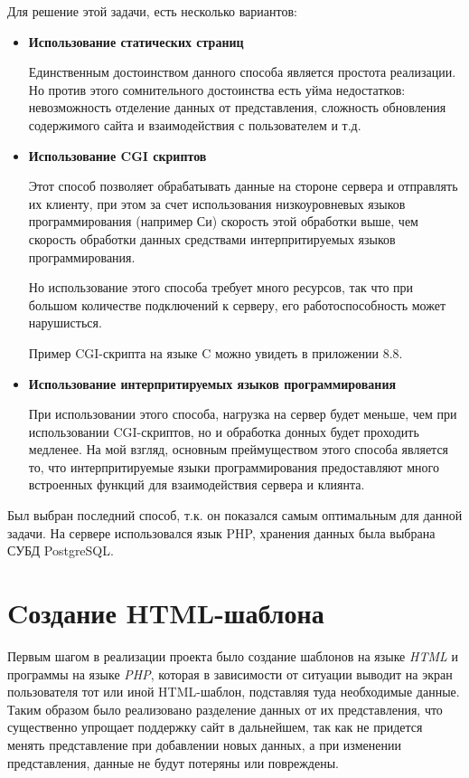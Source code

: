 \documentclass[a4paper]{article}
\begin{document}
Для решение этой задачи, есть несколько вариантов:
\begin{itemize}
\item \textbf{Использование статических страниц}

Единственным достоинством данного способа является простота реализации. Но против этого сомнительного достоинства есть уйма недостатков: невозможность отделение данных от представления, сложность обновления содержимого сайта и взаимодействия с пользователем и т.д.
\item \textbf{Использование CGI скриптов}

Этот способ позволяет обрабатывать данные на стороне сервера и отправлять их клиенту, при этом за счет использования низкоуровневых языков программирования (например Си) скорость этой обработки выше, чем скорость обработки данных средствами интерпритируемых языков программирования.

Но использование этого способа требует много ресурсов, так что при большом количестве подключений к серверу, его работоспособность может нарушисться.

Пример CGI-скрипта на языке C можно увидеть в приложении 8.8.
\item \textbf{Использование интерпритируемых языков программирования}

При использовании этого способа, нагрузка на сервер будет меньше, чем при использовании CGI-скриптов, но и обработка донных будет проходить медленее. На мой взгляд, основным преймуществом этого способа является то, что интерпритируемые языки программирования предоставляют много встроенных функций для взаимодействия сервера и клиянта.
\end{itemize}

Был выбран последний способ, т.к. он показался самым оптимальным для данной задачи. На сервере использовался язык PHP, хранения данных была выбрана СУБД PostgreSQL.

\section{Cоздание HTML-шаблона}
Первым шагом в реализации проекта было создание шаблонов на языке \textit{HTML} и программы на языке \textit{PHP}, которая в зависимости от ситуации выводит на экран пользователя тот или иной HTML-шаблон, подставляя туда необходимые данные. Таким образом было реализовано разделение данных от их представления, что существенно упрощает поддержку сайт в дальнейшем, так как не придется менять представление при добавлении новых данных, а при изменении представления, данные не будут потеряны или повреждены.
\end{document}
